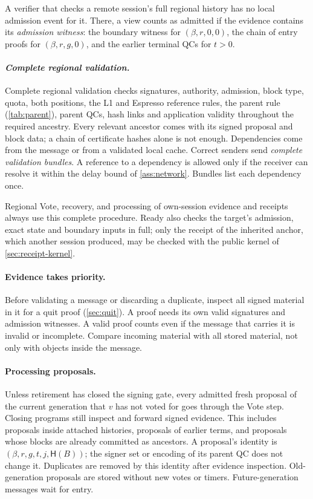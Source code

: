 \documentclass[11pt,a4paper]{article}
\newcommand{\Hash}{\mathsf H}
\newcommand{\defterm}[1]{\textcolor{rrBlue}{\textit{#1}}}
\begin{document}
A verifier that checks a remote session's full regional history has no
local admission event for it. There, a view counts as admitted if the
evidence contains its \defterm{admission witness}: the boundary witness
for $(\beta,r,0,0)$, the chain of entry proofs for $(\beta,r,g,0)$, and
the earlier terminal QCs for $t>0$.

\paragraph{\defterm{Complete regional validation.}}
Complete regional validation checks signatures, authority, admission,
block type, quota, both positions, the L1 and Espresso reference rules,
the parent rule (\cref{tab:parent}), parent QCs, hash links and
application validity throughout the required ancestry. Every relevant
ancestor comes with its signed proposal and block data; a chain of
certificate hashes alone is not enough. Dependencies come from the
message or from a validated local cache. Correct senders send
\defterm{complete validation bundles}. A reference to a dependency is
allowed only if the receiver can resolve it within the delay bound of
\cref{ass:network}. Bundles list each dependency once.

Regional Vote, recovery, and processing of own-session evidence and
receipts always use this complete procedure. Ready also checks the
target's admission, exact state and boundary inputs in full; only the
receipt of the inherited anchor, which another session produced, may be
checked with the public kernel of \cref{sec:receipt-kernel}.

\paragraph{Evidence takes priority.}
Before validating a message or discarding a duplicate, inspect all signed
material in it for a quit proof (\cref{sec:quit}). A proof needs its own
valid signatures and admission witnesses. A valid proof counts even if
the message that carries it is invalid or incomplete. Compare incoming
material with all stored material, not only with objects inside the
message.

\paragraph{Processing proposals.}
Unless retirement has closed the signing gate, every admitted fresh
proposal of the current generation that $v$ has not voted for goes
through the Vote step. Closing programs still inspect and forward signed
evidence. This includes proposals inside attached histories, proposals
of earlier terms, and proposals whose blocks are already committed as
ancestors. A proposal's identity is $(\beta,r,g,t,j,\Hash(B))$; the signer
set or encoding of its parent QC does not change it. Duplicates are
removed by this identity after evidence inspection. Old-generation
proposals are stored without new votes or timers. Future-generation
messages wait for entry.
\end{document}

